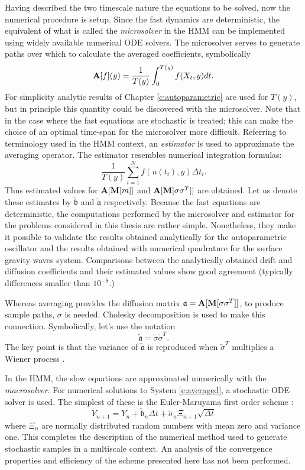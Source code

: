 Having described the two timescale nature the equations to be solved, now the numerical procedure is setup. Since the fast dynamics are deterministic, the equivalent of what is called the \emph{microsolver} in the HMM can be implemented using widely available numerical ODE solvers. The microsolver serves to generate paths over which to calculate the averaged coefficients, symbolically
\[
\operatorname{\mathbf A}[f](y) = \frac{1}{T(y)} \int_0^{T(y)} f(X_t, y) dt.
\]
For simplicity analytic results of Chapter \ref{c:autoparametric} are used for $T(y)$, but in principle this quantity could be discovered with the microsolver. Note that in \citet{e05:_analy} the case where the fast equations are stochastic is treated; this can make the choice of an optimal time-span for the microsolver more difficult. Referring to terminology used in the HMM context, an \emph{estimator} is used to approximate the averaging operator. The estimator resembles numerical integration formulas:
\[
\frac{1}{T(y)} \sum_{i=1}^N f(u(t_i),y) \Delta t_i.
\]
Thus estimated values for $\operatorname{\mathbf A}[\operatorname{\mathbf M}[m]]$ and $\operatorname{\mathbf A}[\operatorname{\mathbf M}[\sigma \sigma^T]]$ are obtained. Let us denote these estimates by $\tilde{\mathfrak b}$ and $\tilde{\mathfrak a}$ respectively. Because the fast equations are deterministic, the computations performed by the microsolver and estimator for the problems considered in this thesis are rather simple. Nonetheless, they make it possible to validate the results obtained analytically for the autoparametric oscillator and the results obtained with numerical quadrature for the surface gravity waves system. Comparisons between the analytically obtained drift and diffusion coefficients and their estimated values show good agreement (typically differences smaller than $10^{-8}$.)

Whereas averaging provides the diffusion matrix $\mathfrak{a} = \operatorname{\mathbf A}[\operatorname{\mathbf M}[\sigma \sigma^T]]$, to produce sample paths, $\sigma$ is needed. Cholesky decomposition is used to make this connection. Symbolically, let's use the notation
\[
\tilde{\mathfrak a} = \tilde \sigma \tilde \sigma^T.
\]
The key point is that the variance of $\tilde{\mathfrak a}$ is reproduced when $\tilde \sigma^T$ multiplies a Wiener process \citep{law82:_simul}.

In the HMM, the slow equations are approximated numerically with the \emph{macrosolver}. For numerical solutions to System \eqref{e:averaged}, a stochastic ODE solver is used. The simplest of these is the Euler-Maruyama first order scheme \citep{kloeden99:_numer_solut_stoch_differ_equat}:
\[
Y_{n+1} = Y_n + \tilde{\mathfrak b}_n \Delta t + \tilde \sigma_n \Xi_{n+1} \sqrt{\Delta t}
\]
where $\Xi_n$ are normally distributed random numbers with mean zero and variance one. This completes the description of the numerical method used to generate stochastic samples in a multiscale context. An analysis of the convergence properties and efficiency of the scheme presented here has not been performed.

